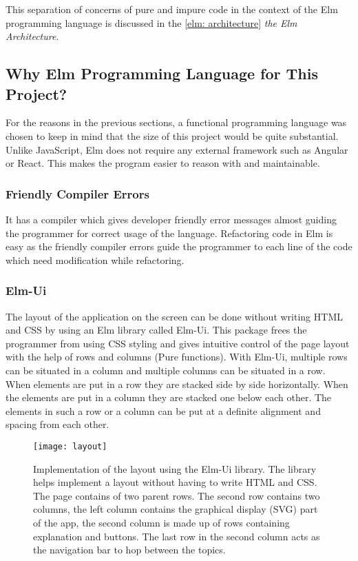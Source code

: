 This separation of concerns of pure and impure code in the context of the Elm
programming language is discussed in the \autoref{elm: architecture}
\emph{the Elm Architecture}.

\subsection{Why Elm Programming Language for This Project?}

For the reasons in the previous sections, a functional programming language was
chosen to keep in mind that the size of this project would be quite
substantial.  Unlike JavaScript, Elm does not require any external framework
such as Angular or React. This makes the program easier to reason with and
maintainable.

\subsubsection{Friendly Compiler Errors}
It has a compiler which gives developer friendly error messages almost guiding the
programmer for correct usage of the language. Refactoring code in Elm is easy
as the friendly compiler errors guide the programmer to each line of the code
which need modification while refactoring.

\subsubsection{Elm-Ui}
The layout of the application on the screen can be done without writing HTML
and CSS by using an Elm library called Elm-Ui. This package frees the
programmer from using CSS styling and gives intuitive control of the page
layout with the help of rows and columns (Pure functions). With Elm-Ui,
multiple rows can be situated in a column and multiple columns can be situated
in a row. When elements are put in a row they are stacked side by side
horizontally. When the elements are put in a column they are stacked one below
each other. The elements in such a row or a column can be put at a definite
alignment and spacing from each other.

\begin{figure}[!ht]
\centering
\texttt{[image: layout]}
\caption{
         Implementation of the layout using the Elm-Ui library. The library helps implement a layout without having to write HTML and CSS. The page contains of two parent
         rows. The second row contains two columns, the left column contains
         the graphical display (SVG) part of the app, the second column is made up of
         rows containing explanation and buttons. The last row in the second column
         acts as the navigation bar to hop between the topics.
        }
\end{figure}

